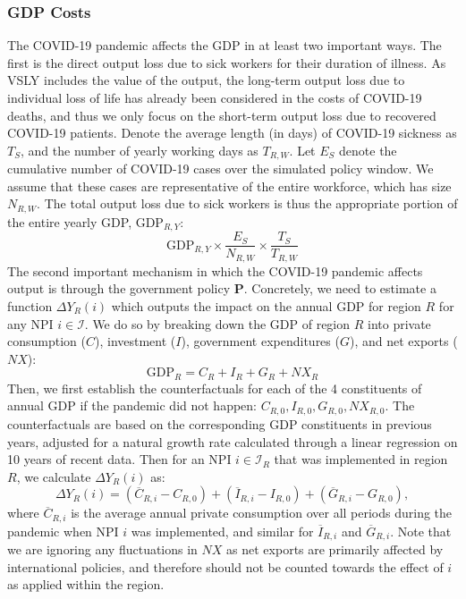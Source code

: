 \documentclass[msom,blindrev]{informs3} %
\begin{document}
\subsubsection*{GDP Costs}
The COVID-19 pandemic affects the GDP in at least two important ways. The first is the direct output loss due to sick workers for their duration of illness. As VSLY includes the value of the output, the long-term output loss due to individual loss of life has already been considered in the costs of COVID-19 deaths, and thus we only focus on the short-term output loss due to recovered COVID-19 patients. Denote the average length (in days) of COVID-19 sickness as $T_S$, and the number of yearly working days as $T_{R,W}$. Let $E_S$ denote the cumulative number of COVID-19 cases over the simulated policy window. We assume that these cases are representative of the entire workforce, which has size $N_{R,W}$. %
The total output loss due to sick workers is thus the appropriate portion of the entire yearly GDP, $\text{GDP}_{R,Y}$:
\begin{equation}
    \text{GDP}_{R,Y} \times \frac{E_S}{N_{R,W}}\times  \frac{T_S}{T_{R,W}}
\end{equation}
The second important mechanism in which the COVID-19 pandemic affects output is through the government policy $\bm{P}$. Concretely, we need to estimate a function $\Delta Y_R(i)$ which outputs the impact on the annual GDP for region $R$ for any NPI $i \in \mathcal{I}$. We do so by breaking down the GDP of region $R$ into private consumption ($C$), investment ($I$), government expenditures ($G$), and net exports ($NX$):
\[\text{GDP}_R=C_R+I_R+G_R+{NX}_R\]
Then, we first establish the counterfactuals for each of the 4 constituents of annual GDP if the pandemic did not happen: $C_{R,0},I_{R,0},G_{R,0},{NX}_{R,0}$. The counterfactuals are based on the corresponding GDP constituents in previous years, adjusted for a natural growth rate calculated through a linear regression on 10 years of recent data. Then for an NPI $i\in \mathcal{I}_R$ that was implemented in region $R$, we calculate $\Delta Y_R(i)$ as:
\[\Delta Y_R(i)=(\overline{C}_{R,i}-C_{R,0})+(\overline{I}_{R,i}-I_{R,0})  + (\overline{G}_{R,i}-G_{R,0}) ,\]
where $\overline{C}_{R,i}$ is the average annual private consumption over all periods during the pandemic when NPI $i$ was implemented, and similar for $\overline{I}_{R,i}$ and $\overline{G}_{R,i}$. Note that we are ignoring any fluctuations in $NX$ as net exports are primarily affected by international policies, and therefore should not be counted towards the effect of $i$ as applied within the region. 
\end{document}
